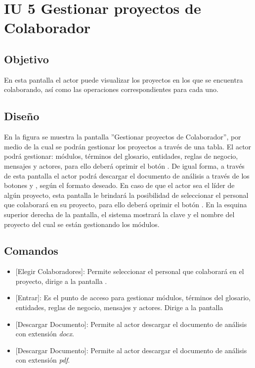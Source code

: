 \section{IU 5 Gestionar proyectos de Colaborador}

\subsection{Objetivo}
	En esta pantalla el actor puede visualizar los proyectos en los que se encuentra colaborando, así como las operaciones correspondientes para cada uno.
\subsection{Diseño}
	En la figura  se muestra la pantalla ''Gestionar proyectos de Colaborador'', por medio de la cual se podrán gestionar los proyectos a través de una tabla. El actor podrá gestionar: módulos, términos del glosario, entidades, reglas de negocio, mensajes y actores, para ello deberá oprimir el botón . De igual forma, a través de esta pantalla el actor podrá descargar el documento de análisis a través de los botones 
	 y , según el formato deseado. En caso de que el actor sea el líder de algún proyecto,	esta pantalla le brindará la posibilidad de seleccionar el personal que colaborará en su proyecto, para ello deberá oprimir el botón .
	En la esquina superior derecha de la pantalla, el sistema mostrará la clave y el nombre del proyecto del cual se están gestionando los módulos.

\subsection{Comandos}
\begin{itemize}
	\item {} [Elegir Colaboradores]: Permite seleccionar el personal que colaborará en el proyecto, dirige a la pantalla .
	\item {} [Entrar]: Es el punto de acceso para gestionar módulos, términos del glosario, entidades, reglas de negocio, mensajes y actores. Dirige a la pantalla 
	\item {} [Descargar Documento]: Permite al actor descargar el documento de análisis con extensión {\em docx}.
	\item {} [Descargar Documento]: Permite al actor descargar el documento de análisis con extensión {\em pdf}.
\end{itemize}
